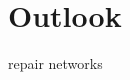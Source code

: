 \section{Outlook}\label{ausblick}


repair networks
\cite{Tanno2022repairingneuralnetworkfromcorrupt}


\newpage
